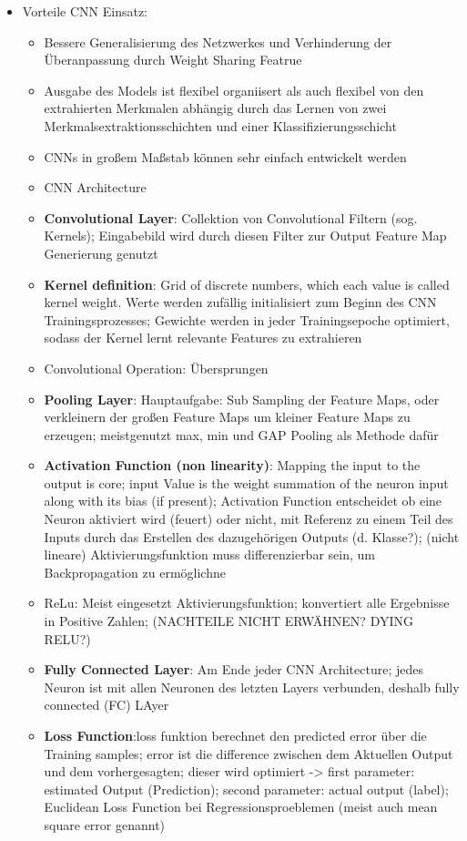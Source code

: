 \begin{itemize}
\begin{itemize}
        \item Vorteile CNN Einsatz:
        \begin{itemize}
            \item Bessere Generalisierung des Netzwerkes und Verhinderung der Überanpassung durch Weight Sharing Featrue
            \item Ausgabe des Models ist flexibel organiisert als auch flexibel von den extrahierten Merkmalen abhängig durch das Lernen von zwei Merkmalsextraktionsschichten und einer Klassifizierungsschicht
            \item CNNs in großem Maßstab können sehr einfach entwickelt werden
        \end{itemize}
        \begin{itemize}
            \item CNN Architecture
            \item \textbf{Convolutional Layer}: Collektion von Convolutional Filtern (sog. Kernels); Eingabebild wird durch diesen Filter zur Output Feature Map Generierung genutzt
            \item \textbf{Kernel definition}: Grid of discrete numbers, which each value is called kernel weight. Werte werden zufällig initialisiert zum Beginn des CNN Trainingsprozesses; Gewichte werden in jeder Trainingsepoche optimiert, sodass der Kernel lernt relevante Features zu extrahieren
            \item Convolutional Operation: Übersprungen
            \item \textbf{Pooling Layer}: Hauptaufgabe: Sub Sampling der Feature Maps, oder verkleinern der großen Feature Maps um kleiner Feature Maps zu erzeugen; meistgenutzt max, min und GAP Pooling als Methode dafür
            \item \textbf{Activation Function (non linearity)}: Mapping the input to the output is core; input Value is the weight summation of the neuron input along with its bias (if present); Activation Function entscheidet ob eine Neuron aktiviert wird (feuert) oder nicht, mit Referenz zu einem Teil des Inputs  durch das Erstellen des dazugehörigen Outputs (d. Klasse?); (nicht lineare) Aktivierungsfunktion muss differenzierbar sein, um Backpropagation zu ermöglichne
            \item ReLu: Meist eingesetzt Aktivierungsfunktion; konvertiert alle Ergebnisse in Positive Zahlen; (NACHTEILE NICHT ERWÄHNEN? DYING RELU?)
            \item \textbf{Fully Connected Layer}: Am Ende jeder CNN Architecture; jedes Neuron ist mit allen Neuronen des letzten Layers verbunden, deshalb fully connected (FC) LAyer
            \item \textbf{Loss Function}:loss funktion berechnet den predicted error über die Training samples; error ist die difference zwischen dem Aktuellen Output und dem vorhergesagten; dieser wird optimiert -> first parameter: estimated Output (Prediction); second parameter: actual output (label); Euclidean Loss Function bei Regressionsproeblemen (meist auch mean square error genannt) 
        \end{itemize}
    \end{itemize}
    

\end{itemize}
